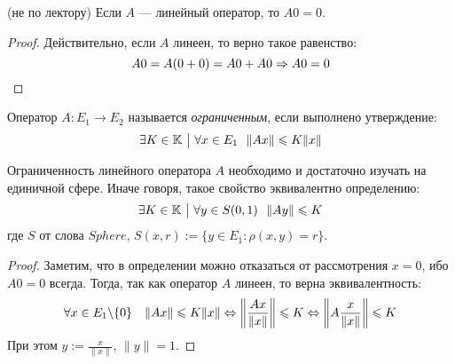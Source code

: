 \begin{proposition} (не по лектору)
	Если $A$ --- линейный оператор, то $A0 = 0$.
\end{proposition}

\begin{proof}
	Действительно, если $A$ линеен, то верно такое равенство:
	\[
		A0 = A(0 + 0) = A0 + A0 \Rightarrow A0 = 0
	\]
\end{proof}

\begin{definition}
	Оператор $A \colon E_1 \to E_2$ называется \textit{ограниченным}, если выполнено утверждение:
	\[
		\exists K \in \K \such \forall x \in E_1\ \ \|Ax\| \le K\|x\|
	\]
\end{definition}

\begin{proposition}
	Ограниченность линейного оператора $A$ необходимо и достаточно изучать на единичной сфере. Иначе говоря, такое свойство эквивалентно определению:
	\[
		\exists K \in \mathbb{K} \ \big|\  \forall y \in S(0, 1)\ \ \|Ay\| \leqslant K
	\]
	где $S$ от слова $Sphere$, $S(x, r) := \{y \in E_1 \colon \rho(x, y) = r\}$.
\end{proposition}

\begin{proof}
	Заметим, что в определении можно отказаться от рассмотрения $x = 0$, ибо $A0 = 0$ всегда. Тогда, так как оператор $A$ линеен, то верна эквивалентность:
	\[
		\forall x \in E_1 \backslash \{0\}\quad \|Ax\| \leqslant K\|x\| \Leftrightarrow \left\|\frac{Ax}{\|x\|}\right\| \leqslant K \Leftrightarrow \left\|A\frac{x}{\|x\|}\right\| \leqslant K
	\]
	При этом $y := \frac{x}{\|x\|}$, $\|y\| = 1$.
\end{proof}